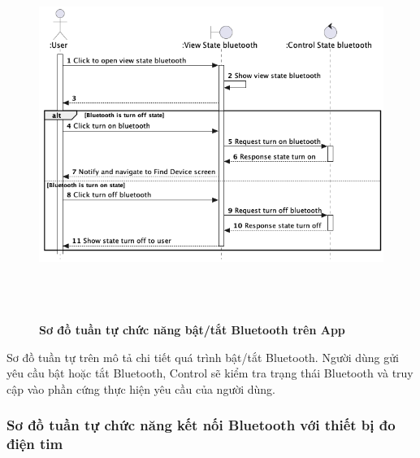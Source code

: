   \begin{figure}[H]
        \centering
        \includegraphics[width=16cm,height=12cm]{Images/mobile_app/turn_on_off_bluetooth.png}
        \caption[Sơ đồ tuần tự chức năng bật/tắt Bluetooth trên App]{\bfseries \fontsize{12pt}{0pt}
        \selectfont Sơ đồ tuần tự chức năng bật/tắt Bluetooth trên App}
        \label{turn_on_off_bluetooth} %
  \end{figure}

  Sơ đồ tuần tự trên mô tả chi tiết quá trình bật/tắt Bluetooth. Người dùng gửi yêu cầu bật hoặc tắt Bluetooth, Control sẽ kiểm tra
  trạng thái Bluetooth và truy cập vào phần cứng thực hiện yêu cầu của người dùng.

\subsubsection{Sơ đồ tuần tự chức năng kết nối Bluetooth với thiết bị đo điện tim}
\mbox{}

